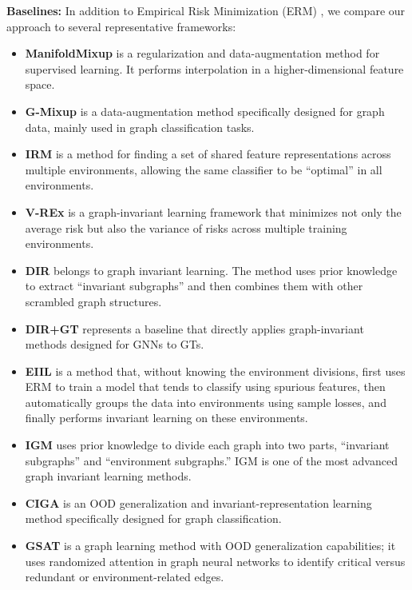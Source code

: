 \documentclass[a4paper,fleqn]{cas-dc}
\begin{document}
\textbf{Baselines:} In addition to Empirical Risk Minimization (ERM) \cite{donini2018empirical}, we compare our approach to several representative frameworks:
\begin{itemize}
  \item \textbf{ManifoldMixup} \cite{verma2019manifold} is a regularization and data-augmentation method for supervised learning. It performs interpolation in a higher-dimensional feature space.
  \item \textbf{G-Mixup} \cite{han2022g} is a data-augmentation method specifically designed for graph data, mainly used in graph classification tasks.
  \item \textbf{IRM} \cite{DBLP:journals/corr/abs-1907-02893} is a method for finding a set of shared feature representations across multiple environments, allowing the same classifier to be ``optimal'' in all environments.
  \item \textbf{V-REx} \cite{krueger2021out} is a graph-invariant learning framework that minimizes not only the average risk but also the variance of risks across multiple training environments.
  \item \textbf{DIR} \cite{wu2022discovering} belongs to graph invariant learning. The method uses prior knowledge to extract ``invariant subgraphs'' and then combines them with other scrambled graph structures.
  \item {\color{blue}\textbf{DIR+GT} represents a baseline that directly applies graph-invariant methods designed for GNNs to GTs.}
  \item \textbf{EIIL} \cite{creager2021environment} is a method that, without knowing the environment divisions, first uses ERM to train a model that tends to classify using spurious features, then automatically groups the data into environments using sample losses, and finally performs invariant learning on these environments.
  \item \textbf{IGM} \cite{jia2024graph} uses prior knowledge to divide each graph into two parts, ``invariant subgraphs'' and ``environment subgraphs.'' IGM is one of the most advanced graph invariant learning methods.
  \item \textbf{CIGA} \cite{chen2023pareto} is an OOD generalization and invariant-representation learning method specifically designed for graph classification.
  \item \textbf{GSAT} \cite{miao2022interpretable} is a graph learning method with OOD generalization capabilities; it uses randomized attention in graph neural networks to identify critical versus redundant or environment-related edges.


\end{itemize}
\end{document}
